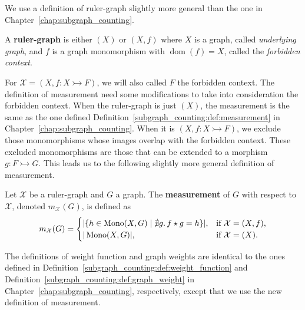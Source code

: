 
We use a definition of ruler-graph slightly more general than the one in Chapter~\ref{chap:subgraph_counting}.

\begin{definition}
    \label{antipattern:def:ruler_graph}
    A \textbf{ruler-graph} is either $(X)$ or \( (X, f) \) where $X$ is a graph, called \emph{underlying graph}, and $f$ is a graph monomorphism with $\operatorname{dom}(f) = X$, called the \emph{forbidden context}.
\end{definition}
For $\mathcal{X} = (X, f:X \rightarrowtail F)$, we will also called $F$ the forbidden context. The definition of measurement need some modifications to take into consideration the forbidden context. When the ruler-graph is just $(X)$, the measurement is the same as the one defined Definition~\ref{subgraph_counting:def:measurement} in Chapter~\ref{chap:subgraph_counting}. When it is $(X, f:X \rightarrowtail F)$, we exclude those monomorphisms whose images overlap with the forbidden context. These excluded monomorphisms are those that can be extended to a morphism $g: F \rightarrowtail G$. This leads us to the following slightly more general definition of measurement.
\begin{definition} 
    \label{antipattern:def:measurement}
    Let \( \mathcal{X}\) be a ruler-graph and \( G \) a graph. The \textbf{measurement} of \( G \) with respect to \( \mathcal{X}\), denoted \( m_\mathcal{X}(G) \), is defined as 
    \[
        m_\mathcal{X}(G) =
        \begin{cases}
            |\{h \in \operatorname{Mono}(X,G) \mid \nexists g.\,f \star g = h \}|, & \text{if } \mathcal{X} = (X, f), \\
            |\operatorname{Mono}(X,G)|, & \text{if } \mathcal{X} = (X).
        \end{cases}
    \]
\end{definition}
The definitions of weight function and graph weights are identical to the ones defined in Definition~\ref{subgraph_counting:def:weight_function} and Definition~\ref{subgraph_counting:def:graph_weight} in Chapter~\ref{chap:subgraph_counting}, respectively, except that we use the new definition of measurement.